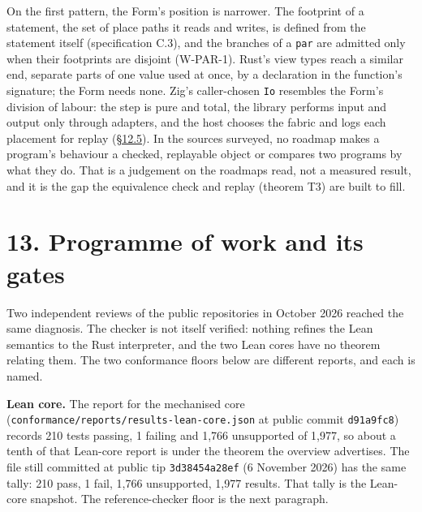 \documentclass[10pt,letterpaper]{article}
\newcounter{none}
\begin{document}
On the first pattern, the Form's position is narrower. The footprint of
a statement, the set of place paths it reads and writes, is defined from
the statement itself (specification C.3), and the branches of a
\texttt{par} are admitted only when their footprints are disjoint
(W-PAR-1). Rust's view types reach a similar end, separate parts of one
value used at once, by a declaration in the function's signature; the
Form needs none. Zig's caller-chosen \texttt{Io} resembles the Form's
division of labour: the step is pure and total, the library performs
input and output only through adapters, and the host chooses the fabric
and logs each placement for replay
(\href{https://research.openie.dev/papers/rce/\#125-the-library-and-the-compute-fabric}{§12.5}).
In the sources surveyed, no roadmap makes a program's behaviour a
checked, replayable object or compares two programs by what they do.
That is a judgement on the roadmaps read, not a measured result, and it
is the gap the equivalence check and replay (theorem T3) are built to
fill.

\section{13. Programme of work and its
gates}\label{programme-of-work-and-its-gates}

Two independent reviews of the public repositories in October 2026
reached the same diagnosis. The checker is not itself verified: nothing
refines the Lean semantics to the Rust interpreter, and the two Lean
cores have no theorem relating them. The two conformance floors below
are different reports, and each is named.

\textbf{Lean core.} The report for the mechanised core
(\texttt{conformance/\allowbreak{}reports/\allowbreak{}results-\allowbreak{}lean-\allowbreak{}core.\allowbreak{}json} at public commit
\texttt{d91a9fc8}) records 210 tests passing, 1 failing and 1,766
unsupported of 1,977, so about a tenth of that Lean-core report is under
the theorem the overview advertises. The file still committed at public
tip \texttt{3d38454a28ef} (6 November 2026) has the same tally: 210
pass, 1 fail, 1,766 unsupported, 1,977 results. That tally is the
Lean-core snapshot. The reference-checker floor is the next paragraph.
\end{document}
